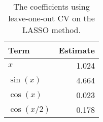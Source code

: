 \begin{table}[t]

\caption{\label{tab:lasso-coefs}The coefficients using leave-one-out \ac{CV} on the \ac{LASSO} method.}
\centering
\begin{tabular}{lr}
\toprule
Term & Estimate\\
\midrule
\(x\) & 1.024\\
\(\sin(x)\) & 4.664\\
\(\cos(x)\) & 0.023\\
\(\cos(x/2)\) & 0.178\\
\bottomrule
\end{tabular}
\end{table}
